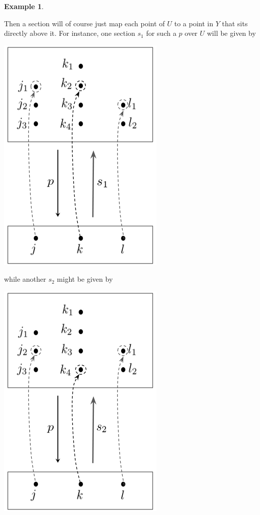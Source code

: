 \documentclass[a4paper]{book}
\theoremstyle{definition}
\newtheorem{example}{Example}[section]
\theoremstyle{definition}
\theoremstyle{definition}
\theoremstyle{theorem}
\theoremstyle{definition}
\begin{document}
\begin{example}
\begin{center}
\end{center}
Then a section will of course just map each point of $U$ to a point in $Y$ that sits directly above it. For instance, one section $s_1$ for such a $p$ over $U$ will be given by 
\begin{center}
	\includegraphics*[scale=0.25]{SectionOne.png}
\end{center}
while another $s_2$ might be given by 
\begin{center}
	\includegraphics*[scale=0.25]{SectionTwo.png}

\end{center}
\end{example}
\end{document}
